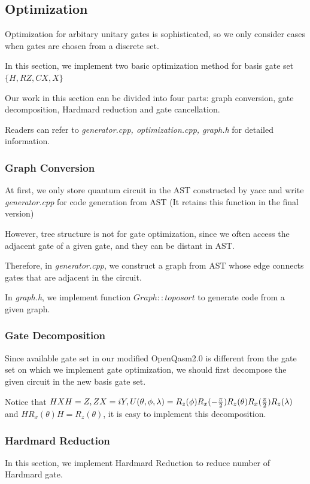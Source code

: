 \subsection{Optimization}

Optimization for arbitary unitary gates is sophisticated, so we only consider cases when gates are chosen from a discrete set.

In this section, we implement two basic optimization method for basis gate set $\{H, RZ, CX, X\}$

Our work in this section can be divided into four parts: graph conversion, gate decomposition, Hardmard reduction and gate cancellation.

Readers can refer to \textit{generator.cpp, optimization.cpp, graph.h} for detailed information.
\subsubsection{Graph Conversion}

At first, we only store quantum circuit in the AST constructed by yacc and write \textit{generator.cpp} for code generation from AST (It retains this function in the final version)

However, tree structure is not for gate optimization, since we often access the adjacent gate of a given gate, and they can be distant in AST.

Therefore, in \textit{generator.cpp}, we construct a graph from AST whose edge connects gates that are adjacent in the circuit.

In \textit{graph.h}, we implement function $Graph::toposort$ to generate code from a given graph.

\subsubsection{Gate Decomposition}
Since available gate set in our modified OpenQasm2.0 is different from the gate set on which we implement gate optimization, we should first decompose the given circuit in the new basis gate set.

Notice that $HXH = Z, ZX = iY, U(\theta, \phi, \lambda) = R_z(\phi)R_x(-\frac{\pi}{2})R_z(\theta)R_x(\frac{\pi}{2})R_z(\lambda)\\$ and $HR_x(\theta)H = R_z(\theta)$, it is easy to implement this decomposition.

    \subsubsection{Hardmard Reduction}
    In this section, we implement Hardmard Reduction to reduce number of Hardmard gate.

